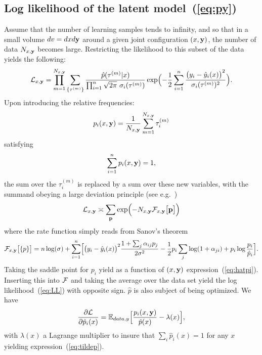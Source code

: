 \documentclass[envcountsect,runningheads]{llncs}
\theoremstyle{etoile}
\begin{document}
\begin{appendix}
\section{Log likelihood of the latent model~(\ref{eq:py})}\label{app:LL}
Assume that the number of learning samples tends to infinity, and so that in a small volume $dv = dxd{\bf y}$ around a given  joint configuration $(x,{\bf y})$,
the number of data $N_{x,{\bf y}}$ becomes large. Restricting the likelihood to this subset of the data yields the following:
\[
{\cal L}_{x,{\bf y}} = \prod_{m=1}^{N_{x,{\bf y}}} \sum_{\{\tau^{(m)}\}} 
\frac{\hat p(\tau^{(m)}\vert x)}{\prod_{i=1}^n\sqrt{2\pi}\ \sigma_i(\tau^{(m)})}
\exp\Bigl(-\frac{1}{2}\sum_{i=1}^n\frac{\bigl(y_i-\hat y_i(x)\bigr)^2}{\sigma_i(\tau^{(m)})^2}\Bigr).
\]
Upon introducing the relative frequencies:
\[
p_i(x,{\bf y}) = \frac{1}{N_{x,{\bf y}}}\sum_{m=1}^{N_{x,{\bf y}}} \tau_i^{(m)} 
\]
satisfying 
\begin{equation}\label{eq:cs2}
\sum_{i=1}^n p_i(x,{\bf y}) = 1,
\end{equation}
the sum over the $\tau_i^{(m)}$ is replaced by a sum over these new variables, with the summand obeying a large deviation principle (see e.g.~\cite{Touchette})
\[
{\cal L}_{x,{\bf y}} \asymp \sum_{{\bf p}} 
\exp\Bigl(-N_{x,{\bf y}} {\cal F}_{x,{\bf y}}\bigl[{\bf p}\bigr]\Bigr)
\]
where the rate function simply reads from Sanov's theorem
\[
{\cal F}_{x,{\bf y}}\bigl[\{p\}\bigr] = n\log(\sigma)+
\sum_{i=1}^n\Bigl[\bigl(y_i-\hat y_i(x)\bigr)^2\frac{1+\sum_j\alpha_{ij}p_j}{2\sigma^2}
-\frac{1}{2}p_i\sum_j\log(1+\alpha_{ji})+p_i\log\frac{p_i}{\hat p_i}\Bigr].
\]
Taking the saddle point for $p_i$ yield as a function of $(x,{\bf y})$ expression~(\ref{eq:hatpi}). Inserting this into ${\cal F}$ and taking
the average over the data set yield the log likelihood~(\ref{eq:LL}) with opposite sign. 
$\hat p$ is also subject of being optimized. We have
\[
\frac{\partial{\cal L}}{\partial \hat p_i(x)} = {\mathbb E}_{data,y}\Bigl[\frac{p_i(x,{\bf y})}{\hat p(x)}-\lambda(x)\Bigr],
\]
with $\lambda(x)$ a Lagrange multiplier to insure that $\sum_i\hat p_i(x)=1$ for any $x$ yielding expression~(\ref{eq:tildep}).


\end{appendix}
\end{document}
